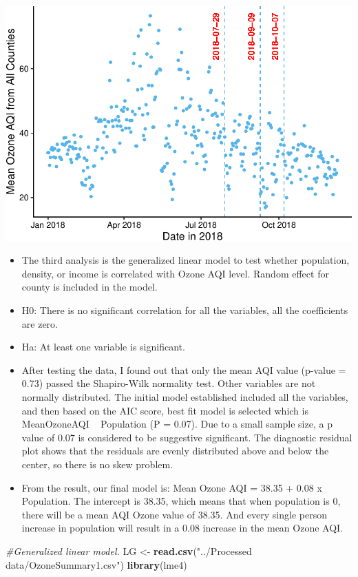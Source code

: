 \documentclass[12pt,]{article}
\newenvironment{Shaded}{\begin{snugshade}}{\end{snugshade}}
\newcommand{\KeywordTok}[1]{\textcolor[rgb]{0.13,0.29,0.53}{\textbf{#1}}}
\newcommand{\StringTok}[1]{\textcolor[rgb]{0.31,0.60,0.02}{#1}}
\newcommand{\CommentTok}[1]{\textcolor[rgb]{0.56,0.35,0.01}{\textit{#1}}}
\newcommand{\NormalTok}[1]{#1}
\begin{document}
\includegraphics{Xia_ENV_872_Project_files/figure-latex/Final visualization 3-1.pdf}
\pagebreak

\begin{itemize}
\item[]The third analysis is the generalized linear model to test whether population, density, or income is correlated with Ozone AQI level. Random effect for county is included in the model.
\item[]H0: There is no significant correlation for all the variables, all the coefficients are zero. 
\item[]Ha: At least one variable is significant.
\item[]After testing the data, I found out that only the mean AQI value (p-value = 0.73) passed the Shapiro-Wilk normality test. Other variables are not normally distributed. The initial model established included all the variables, and then based on the AIC score, best fit model is selected which is MeanOzoneAQI  ~ Population (P = 0.07). Due to a small sample size, a p value of 0.07 is considered to be suggestive significant. The diagnostic residual plot shows that the residuals are evenly distributed above and below the center, so there is no skew problem.
\item[]From the result, our final model is: Mean Ozone AQI = 38.35 + 0.08 x Population. The intercept is 38.35, which means that when population is 0, there will be a mean AQI Ozone value of 38.35. And every single person increase in population will result in a 0.08 increase in the mean Ozone AQI.
\end{itemize}

\begin{Shaded}
\begin{Highlighting}[]
\CommentTok{#Generalized linear model.}
\NormalTok{LG <-}\StringTok{ }\KeywordTok{read.csv}\NormalTok{(}\StringTok{"../Processed data/OzoneSummary1.csv"}\NormalTok{)}
\KeywordTok{library}\NormalTok{(lme4)}
\end{Highlighting}
\end{Shaded}
\end{document}
